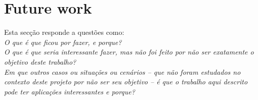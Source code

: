 \documentclass[titlepage,12pt,a4paper,times]{book}
\begin{document}
\section{Future work}
\label{sec:future-work}

Esta secção responde a questões como:\\
\emph{O que é que ficou por fazer, e porque?}\\
\emph{O que é que seria interessante fazer, mas não foi feito por não ser
exatamente o objetivo deste trabalho?}\\
\emph{Em que outros casos ou situações ou cenários -- que não foram estudados
no contexto deste projeto por não ser seu objetivo -- é que o trabalho aqui
descrito pode ter aplicações interessantes e porque?}

% 
% 
% 
% 

\backmatter


\end{document}

